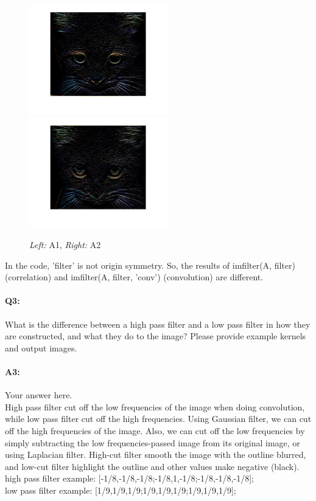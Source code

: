 	\begin{figure}[h]
    \centering
    \includegraphics[width=6cm]{questions/f1.jpg}
    \includegraphics[width=6cm]{questions/f2.jpg}
    \caption{\emph{Left:} A1, \emph{Right:} A2}
    \end{figure}
	
	In the code, 'filter' is not origin symmetry. So, the results of imfilter(A, filter) (correlation) and imfilter(A, filter, 'conv') (convolution) are different. 
	
	
	
	\pagebreak
	\paragraph{Q3:} What is the difference between a high pass filter and a low pass filter in how they are constructed, and what they do to the image? Please provide example kernels and output images.
	
	\paragraph{A3:} Your answer here.\\
	
	High pass filter cut off the low frequencies of the image when doing convolution, while low pass filter cut off the high frequencies. Using Gaussian filter, we can cut off the high frequencies of the image. Also, we can cut off the low frequencies by simply subtracting the low frequencies-passed image from its original image, or using Laplacian filter. High-cut filter smooth the image with the outline blurred, and low-cut filter highlight the outline and other values make negative (black).\\
	high pass filter example: [-1/8,-1/8,-1/8;-1/8,1,-1/8;-1/8,-1/8,-1/8];\\
	low pass filter example: [1/9,1/9,1/9;1/9,1/9,1/9;1/9,1/9,1/9];
	
